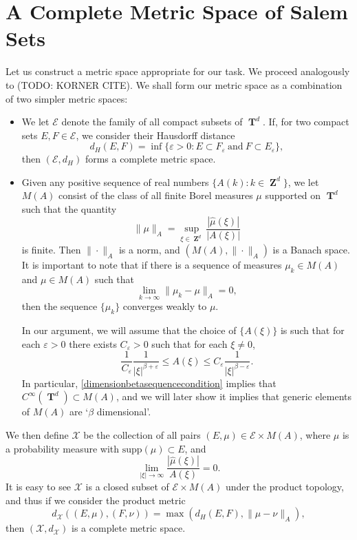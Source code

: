\documentclass[12pt,reqno]{article}
\DeclareMathOperator{\ZZ}{\mathbf{Z}}
\DeclareMathOperator{\TT}{\mathbf{T}}
\begin{document}
\section{A Complete Metric Space of Salem Sets}

Let us construct a metric space appropriate for our task. We proceed analogously to (TODO: KORNER CITE). We shall form our metric space as a combination of two simpler metric spaces:
%
\begin{itemize}
    \item We let $\mathcal{E}$ denote the family of all compact subsets of $\TT^d$. If, for two compact sets $E,F \in \mathcal{E}$, we consider their Hausdorff distance
    \[ d_H(E,F) = \inf \{ \varepsilon > 0 : E \subset F_\varepsilon\ \text{and}\ F \subset E_\varepsilon \}, \]
    then $(\mathcal{E},d_H)$ forms a complete metric space.

    \item Given any positive sequence of real numbers $\{ A(k) : k \in \ZZ^d \}$, we let $M(A)$ consist of the class of all finite Borel measures $\mu$ supported on $\TT^d$ such that the quantity
    \[ \| \mu \|_A = \sup_{\xi \in \ZZ^d} \frac{|\widehat{\mu}(\xi)|}{|A(\xi)|} \]
    is finite. Then $\| \cdot \|_A$ is a norm, and $(M(A), \| \cdot \|_A)$ is a Banach space. It is important to note that if there is a sequence of measures $\mu_k \in M(A)$ and $\mu \in M(A)$ such that
    \[ \lim_{k \to \infty} \| \mu_k - \mu \|_A = 0, \]
    then the sequence $\{ \mu_k \}$ converges weakly to $\mu$.

    In our argument, we will assume that the choice of $\{ A(\xi) \}$ is such that for each $\varepsilon > 0$ there exists $C_\varepsilon > 0$ such that for each $\xi \neq 0$,
    \begin{equation} \label{dimensionbetasequencecondition}
        \frac{1}{C_\varepsilon} \frac{1}{|\xi|^{\beta + \varepsilon}} \leq A(\xi) \leq C_\varepsilon \frac{1}{|\xi|^{\beta - \varepsilon}}.
    \end{equation}
    In particular, \eqref{dimensionbetasequencecondition} implies that $C^\infty(\TT^d) \subset M(A)$, and we will later show it implies that generic elements of $M(A)$ are `$\beta$ dimensional'.
\end{itemize}
%
We then define $\mathcal{X}$ be the collection of all pairs $(E,\mu) \in \mathcal{E} \times M(A)$, where $\mu$ is a probability measure with $\text{supp}(\mu) \subset E$, and
%
\[ \lim_{|\xi| \to \infty} \frac{|\widehat{\mu}(\xi)|}{A(\xi)} = 0. \]
%
It is easy to see $\mathcal{X}$ is a closed subset of $\mathcal{E} \times M(A)$ under the product topology, and thus if we consider the product metric
%
\[ d_{\mathcal{X}}((E,\mu),(F,\nu)) = \max \left( d_H(E,F), \| \mu - \nu \|_A \right), \]
%
then $(\mathcal{X},d_\mathcal{X})$ is a complete metric space.
\end{document}
